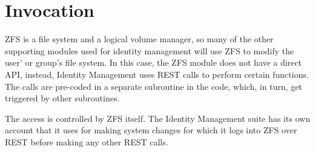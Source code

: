 \section{Invocation}

ZFS is a file system and a logical volume manager, so many of the other supporting modules used for identity management will use ZFS to modify the user' or group's file system. In this case, the ZFS module does not have a direct API, instead, Identity Management uses REST calls to perform certain functions. The calls are pre-coded in a separate subroutine in the code, which, in turn, get triggered by other subroutines.  

The access is controlled by ZFS itself. The Identity Management suite has its own account that it uses for making system changes for which it logs into ZFS over REST before making any other REST calls. 
